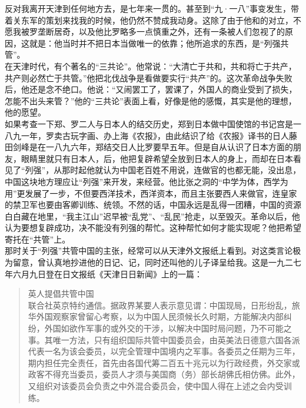 反对我离开天津到任何地方去，是七年来一贯的。甚至到“九·一八”事变发生，带着关东军的策划来找我的时候，他仍然不赞成我动身。这除了由于他和的对立，不愿我被罗垄断居奇，以及他比罗略多一点慎重之外，还有一条被人们忽视了的原因，这就是：他当时并不把日本当做唯一的依靠；他所追求的东西，是“列强共管”。\\

在天津时代，有个著名的“三共论”。他常说：“大清亡于共和，共和将亡于共产，共产则必然亡于共管。”他把北伐战争是看做要实行“共产”的。这次革命战争失败后，他还是念不绝口。他说：“又闹罢工了，罢课了，外国人的商业受到了损失，怎能不出头来管？”他的“三共论”表面上看，好像是他的感慨，其实是他的理想，他的愿望。\\

如果考查一下郑、罗二人与日本人的结交历史，郑到日本做中国使馆的书记宫是一八九一年，罗卖古玩字画、办上海《农报》，由此结识了给《农报》译书的日人藤田剑峰是在一八九六年，郑结交日人比罗要早五年。但是自从认识了日本方面的朋友，眼睛里就只有日本人，后，他把复辟希望全放到日本人的身上，而却在日本看见了“列强”，从那时起他就认为中国老百姓不用说，连做官的也都无能，没出息，中国这块地方理应让“列强”来开发，来经营。他比张之洞的“中学为体，西学为用”更发展了一步，不但要西洋技术，西洋资本，而且主张要西人来做官，连皇家的禁卫军也要由客卿训练、统领。不然的话，中国永远是乱得一团糟，中国的资源白白藏在地里，“我主江山”迟早被“乱党”、“乱民”抢走，以至毁灭。革命以后，他认为要想复辟成功，决不能没有列强的帮忙。这种帮忙如何才能实现呢？他把希望寄托在“共管”上。\\

那时关于“列强”共管中国的主张，经常可以从天津外文报纸上看到。对这类言论极为留意，曾认真地抄进他的日记、记，同时还叫他的儿子译呈给我。这是一九二七年六月九日登在日文报纸《天津日日新闻》上的一篇：\\

\begin{quote}
	英人提倡共管中国\\

联合社英京特约通信。据政界某要人表示意见谓：中国现局，日形纷乱，旅华外国观察家曾留心考察，以为中国人民须候长久时期，方能解决内部纠纷，外国如欲作军事的或外交的干涉，以解决中国时局问题，乃不可能之事。其唯一方法，只有组织国际共管中国委员会，由英美法日德意六国各派代表一名为该会委员，以完全管理中国境内之军事。各委员之任期为三年，期内担任完全责任，首先由各国代筹二百五十兆元以为行政经费，外交家或政客不得充当委员，委员人才须与美国商（务）部长胡佛氏相仿佛。此外，又组织对该委员会负责之中外混合委员会，使中国人得在上述之会内受训练。\\
\end{quote}

